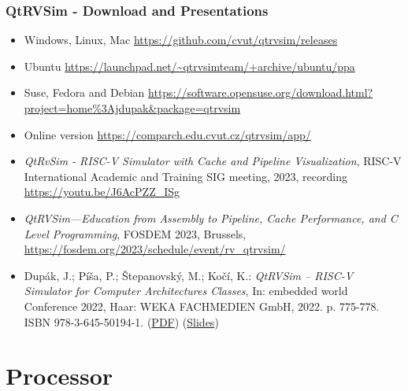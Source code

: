 \documentclass[aspectratio=169]{beamer}
\begin{document}
\begin{frame}
\frametitle{QtRVSim - Download and Presentations}
\begin{itemize}
\item Windows, Linux, Mac \url{https://github.com/cvut/qtrvsim/releases}
\item  Ubuntu \url{https://launchpad.net/~qtrvsimteam/+archive/ubuntu/ppa}
\item Suse, Fedora and Debian \url{https://software.opensuse.org/download.html?project=home\%3Ajdupak\&package=qtrvsim}
\item Online version \url{https://comparch.edu.cvut.cz/qtrvsim/app/}
\item \textit{QtRvSim - RISC-V Simulator with Cache and Pipeline Visualization}, RISC-V International Academic and Training SIG meeting, 2023, recording \url{https://youtu.be/J6AcPZZ_ISg}
\item \textit{QtRVSim—Education from Assembly to Pipeline, Cache Performance, and C Level Programming}, FOSDEM 2023, Brussels, \url{https://fosdem.org/2023/schedule/event/rv_qtrvsim/}
\item Dupák, J.; Píša, P.; Štepanovský, M.; Kočí, K.: \textit{QtRVSim – RISC-V Simulator for Computer Architectures Classes}, In: embedded world Conference 2022, Haar: WEKA FACHMEDIEN GmbH, 2022. p. 775-778. ISBN 978-3-645-50194-1. (\href{https://comparch.edu.cvut.cz/publications/ewC2022-Dupak-Pisa-Stepanovsky-QtRvSim.pdf}{PDF}) (\href{https://comparch.edu.cvut.cz/slides/ewc22-qtrvsim.pdf}{Slides})

\end{itemize}
\end{frame}

\section{Processor}
\end{document}
